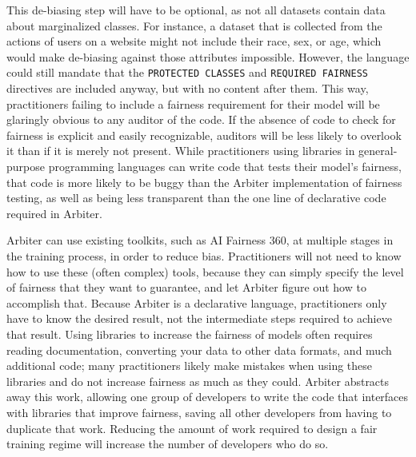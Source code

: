 \documentclass[letterpaper]{article}
\begin{document}
This de-biasing step will have to be optional, as not all datasets contain data about marginalized classes. For instance, a dataset that is collected from the actions of users on a website might not include their race, sex, or age, which would make de-biasing against those attributes impossible. However, the language could still mandate that the \texttt{PROTECTED CLASSES} and \texttt{REQUIRED FAIRNESS} directives are included anyway, but with no content after them. This way, practitioners failing to include a fairness requirement for their model will be glaringly obvious to any auditor of the code. If the absence of code to check for fairness is explicit and easily recognizable, auditors will be less likely to overlook it than if it is merely not present. While practitioners using libraries in general-purpose programming languages can write code that tests their model's fairness, that code is more likely to be buggy than the Arbiter implementation of fairness testing, as well as being less transparent than the one line of declarative code required in Arbiter. 

Arbiter can use existing toolkits, such as AI Fairness 360, at multiple stages in the training process, in order to reduce bias. Practitioners will not need to know how to use these (often complex) tools, because they can simply specify the level of fairness that they want to guarantee, and let Arbiter figure out how to accomplish that. Because Arbiter is a declarative language, practitioners only have to know the desired result, not the intermediate steps required to achieve that result. Using libraries to increase the fairness of models often requires reading documentation, converting your data to other data formats, and much additional code; many practitioners likely make mistakes when using these libraries and do not increase fairness as much as they could. Arbiter abstracts away this work, allowing one group of developers to write the code that interfaces with libraries that improve fairness, saving all other developers from having to duplicate that work. Reducing the amount of work required to design a fair training regime will increase the number of developers who do so.
\end{document}
